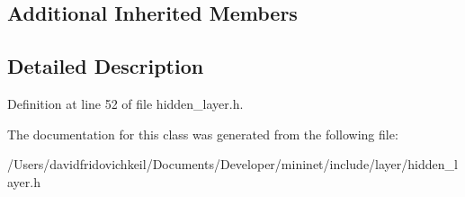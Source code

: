 \subsection*{Additional Inherited Members}


\subsection{Detailed Description}


Definition at line 52 of file hidden\+\_\+layer.\+h.



The documentation for this class was generated from the following file\+:\begin{DoxyCompactItemize}
\item 
/\+Users/davidfridovichkeil/\+Documents/\+Developer/mininet/include/layer/hidden\+\_\+layer.\+h\end{DoxyCompactItemize}
